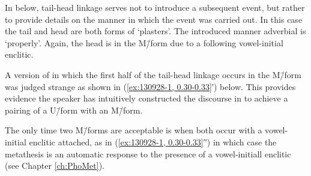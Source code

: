 In  below,
tail-head linkage serves not to introduce a subsequent event,
but rather to provide details on the manner in which the event was carried out.
In this case the tail and head are both forms of  `plasters'.
The introduced manner adverbial is  `properly'.
Again, the head is in the M\=/form due to a following vowel-initial enclitic.


\begin{exe}
	\label{ex:130928-1, 0.30-0.33}
	\begin{xlist}
	\end{xlist}
\end{exe}

A version of  in which
the first half of the tail-head linkage occurs
in the M\=/form was judged strange
as shown in (\ref{ex:130928-1, 0.30-0.33}′) below.
This provides evidence the speaker has intuitively constructed
the discourse in  to achieve a pairing
of a U\=/form with an M\=/form.

The only time two M\=/forms are acceptable is when
both occur with a vowel-initial enclitic attached,
as in (\ref{ex:130928-1, 0.30-0.33}′′) in which case
the metathesis is an automatic response to the 
presence of a vowel-initiall enclitic (see Chapter \ref{ch:PhoMet}).

